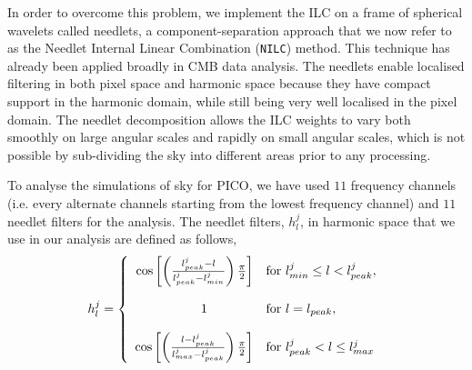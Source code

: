 \documentclass[PICOReport.tex]{subfiles}
\begin{document}
In order to overcome this problem, we implement the ILC on a frame of
spherical wavelets called needlets, a component-separation approach that we now refer to as the Needlet Internal Linear Combination ({\tt NILC}) method. This technique has already been applied broadly in CMB data analysis. The needlets enable localised filtering in both pixel space and harmonic space because they have compact support in the harmonic domain, while still being very well localised in the pixel domain. The needlet decomposition allows the ILC weights to vary both smoothly on large angular scales and rapidly on small angular scales, which is not possible by sub-dividing the sky into different areas prior to any processing.

To analyse the simulations of sky for PICO, we have used $11$ frequency channels (i.e. every alternate channels starting from the lowest frequency channel) and $11$ needlet filters for the analysis. The needlet filters, $h^{j}_{l}$, in harmonic space that we use in our
analysis are defined as follows,
\begin{eqnarray}
h^{j}_{l} = \left\{
\begin{array}{rl} 
\cos\left[\left(\frac{l^{j}_{peak}-l}{l^{j}_{peak}-l^{j}_{min}}\right)
\frac{\pi}{2}\right]& \text{for } l^{j}_{min} \le l < l^{j}_{peak},\\ 
\\
1\hspace{0.5in} & \text{for } l = l_{peak},\\
\\
\cos\left[\left(\frac{l-l^{j}_{peak}}{l^{j}_{max}-l^{j}_{peak}}\right)
\frac{\pi}{2}\right]& \text{for } l^{j}_{peak} < l \le l^{j}_{max} 
\end{array} \right. 
\end{eqnarray}
\end{document}
